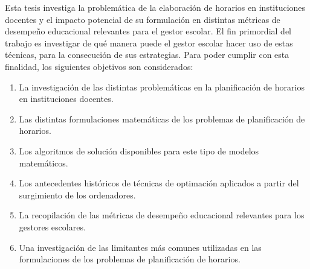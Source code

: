 \documentclass[draft,12pt,headsepline,footsepline,paper=letter]{scrreprt}
\begin{document}
Esta tesis investiga la problemática de la elaboración de horarios en instituciones docentes y el impacto potencial de su formulación en distintas métricas de desempeño educacional relevantes para el gestor escolar. 
El fin primordial del trabajo es investigar de qué manera puede el gestor escolar hacer uso de estas técnicas, para la consecución de sus estrategias.
Para poder cumplir con esta finalidad, los siguientes objetivos son considerados:
\begin{enumerate}[1]
\item La investigación de las distintas problemáticas en la planificación de horarios en instituciones docentes.
\item Las distintas formulaciones matemáticas de los problemas de planificación de horarios.
\item Los algoritmos de solución disponibles para este tipo de modelos matemáticos.
\item Los antecedentes históricos de técnicas de optimación aplicados a partir del surgimiento de los ordenadores.
\item La recopilación de las métricas de desempeño educacional relevantes para los gestores escolares.
\item Una investigación de las limitantes más comunes utilizadas en las formulaciones de los problemas de planificación de horarios.
\end{enumerate}


\end{document}
